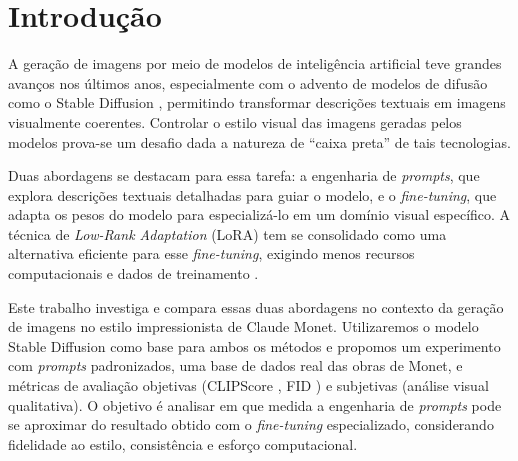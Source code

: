 \section{Introdução}

A geração de imagens por meio de modelos de inteligência artificial teve grandes avanços nos últimos anos, especialmente com o advento de modelos de difusão como o Stable Diffusion \cite{stablediff}, permitindo transformar descrições textuais em imagens visualmente coerentes. Controlar o estilo visual das imagens geradas pelos modelos prova-se um desafio dada a natureza de ``caixa preta'' de tais tecnologias.

Duas abordagens se destacam para essa tarefa: a engenharia de \textit{prompts}, que explora descrições textuais detalhadas para guiar o modelo, e o \textit{fine-tuning}, que adapta os pesos do modelo para especializá-lo em um domínio visual específico. A técnica de \textit{Low-Rank Adaptation} (LoRA) tem se consolidado como uma alternativa eficiente para esse \textit{fine-tuning}, exigindo menos recursos computacionais e dados de treinamento \cite{lora}.

Este trabalho investiga e compara essas duas abordagens no contexto da geração de imagens no estilo impressionista de Claude Monet. Utilizaremos o modelo Stable Diffusion como base para ambos os métodos e propomos um experimento com \textit{prompts} padronizados, uma base de dados real das obras de Monet, e métricas de avaliação objetivas (CLIPScore \cite{clipscore}, FID \cite{fid}) e subjetivas (análise visual qualitativa). O objetivo é analisar em que medida a engenharia de \textit{prompts} pode se aproximar do resultado obtido com o \textit{fine-tuning} especializado, considerando fidelidade ao estilo, consistência e esforço computacional.
